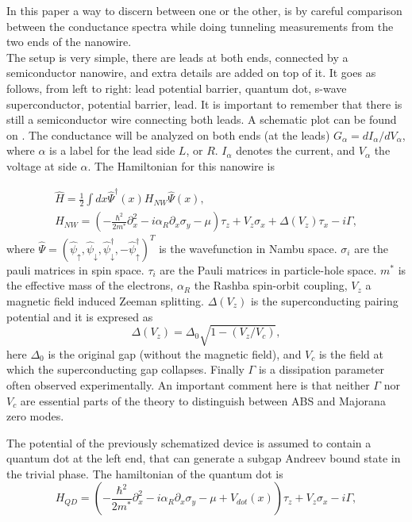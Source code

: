 In this paper a way to discern between one or the other, is by careful comparison between the conductance spectra while doing tunneling measurements from the two ends of the nanowire.\\

The setup is very simple, there are leads at both ends, connected by a semiconductor nanowire, and extra details are added on top of it. It goes as follows, from left to right: lead potential barrier, quantum dot, s-wave superconductor, potential barrier, lead. It is important to remember that there is still a semiconductor wire connecting both leads. A schematic plot can be found on \cite{PhysRevB.96.075161}. The conductance will be analyzed on both ends (at the leads) $G_\alpha = dI_\alpha / dV_\alpha$, where $\alpha$ is a label for the lead side $L$, or $R$. $I_\alpha$ denotes the current, and $V_\alpha$ the voltage at side $\alpha$. The Hamiltonian for this nanowire is 

\begin{equation}
\begin{aligned}
 \hat{H} = \frac{1}{2} \int dx \hat{\Psi}^\dagger(x) H_{NW} \hat{\Psi}(x),\qquad \qquad \qquad \quad\\
 H_{NW} = \left( -\frac{\hbar^2}{2m^*}\partial_x^2 - i\alpha_R \partial_x \sigma_y - \mu \right)\tau_z + V_z\sigma_x + \Delta (V_z) \tau_x - i\Gamma,
\end{aligned}
\end{equation}
where $\hat{\Psi} = (\hat{\psi}_\uparrow,\hat{\psi}_\downarrow,\hat{\psi}_\downarrow^\dagger,-\hat{\psi}_\uparrow^\dagger)^T$ is the wavefunction in Nambu space. $\sigma_i$ are the pauli matrices in spin space. $\tau_i$ are the Pauli matrices in particle-hole space. $m^*$ is the effective mass of the electrons, $\alpha_R$ the Rashba spin-orbit coupling, $V_z$ a magnetic field induced Zeeman splitting. $\Delta(V_z)$ is the superconducting pairing potential and it is expresed as 
\begin{equation}
    \Delta(V_z) = \Delta_0\sqrt{1-(V_z/V_c)},
\end{equation}
here $\Delta_0$ is the original gap (without the magnetic field), and $V_c$ is the field at which the superconducting gap collapses. Finally $\Gamma$ is a dissipation parameter often observed experimentally. An important comment here is that neither $\Gamma$ nor $V_c$ are essential parts of the theory to distinguish between ABS and Majorana zero modes.

The potential of the previously schematized device is assumed to contain a quantum dot at the left end, that can generate a subgap Andreev bound state in the trivial phase. The hamiltonian of the quantum dot is 
\begin{equation}
    H_{QD} = \left(-\frac{\hbar^2}{2m^*}\partial^2_x - i\alpha_R \partial_x\sigma_y - \mu + V_{dot}(x)\right)\tau_z + V_z\sigma_x - i\Gamma,
\end{equation}

